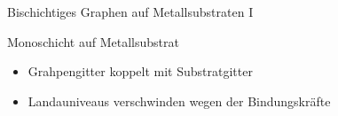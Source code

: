 \documentclass[../defence.tex]{subfiles}
\begin{document}
  \begin{frame}{Bischichtiges Graphen auf Metallsubstraten I}
    \begin{block}{Monoschicht auf Metallsubstrat}
      \begin{itemize}
        \item Grahpengitter koppelt mit Substratgitter
        \item Landauniveaus verschwinden wegen der Bindungskräfte
      \end{itemize}
    \end{block}
  \end{frame}
\end{document}
